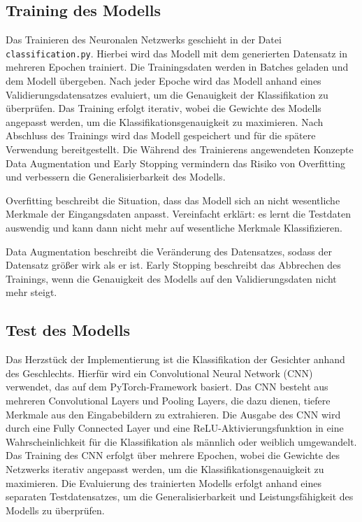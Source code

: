 \documentclass[journal,twoside,web]{ieeecolor}
\begin{document}
\subsection{Training des Modells}
\label{sec:training}
Das Trainieren des Neuronalen Netzwerks geschieht in der Datei \texttt{classification.py}. Hierbei wird das Modell mit dem generierten Datensatz in mehreren Epochen trainiert. Die Trainingsdaten werden in Batches geladen und dem Modell übergeben. Nach jeder Epoche wird das Modell anhand eines Validierungsdatensatzes evaluiert, um die Genauigkeit der Klassifikation zu überprüfen. Das Training erfolgt iterativ, wobei die Gewichte des Modells angepasst werden, um die Klassifikationsgenauigkeit zu maximieren. Nach Abschluss des Trainings wird das Modell gespeichert und für die spätere Verwendung bereitgestellt. Die Während des Trainierens angewendeten Konzepte Data Augmentation und Early Stopping vermindern das Risiko von Overfitting und verbessern die Generalisierbarkeit des Modells.

Overfitting beschreibt die Situation, dass das Modell sich an nicht wesentliche Merkmale der Eingangsdaten anpasst. Vereinfacht erklärt: es lernt die Testdaten auswendig und kann dann nicht mehr auf wesentliche Merkmale Klassifizieren.

Data Augmentation beschreibt die Veränderung des Datensatzes, sodass der Datensatz größer wirk als er ist. 
Early Stopping beschreibt das Abbrechen des Trainings, wenn die Genauigkeit des Modells auf den Validierungsdaten nicht mehr steigt.


\subsection{Test des Modells}
Das Herzstück der Implementierung ist die Klassifikation der Gesichter anhand des Geschlechts. Hierfür wird ein Convolutional Neural Network (CNN) verwendet, das auf dem PyTorch-Framework basiert. Das CNN besteht aus mehreren Convolutional Layers und Pooling Layers, die dazu dienen, tiefere Merkmale aus den Eingabebildern zu extrahieren. Die Ausgabe des CNN wird durch eine Fully Connected Layer und eine ReLU-Aktivierungsfunktion in eine Wahrscheinlichkeit für die Klassifikation als männlich oder weiblich umgewandelt. Das Training des CNN erfolgt über mehrere Epochen, wobei die Gewichte des Netzwerks iterativ angepasst werden, um die Klassifikationsgenauigkeit zu maximieren. Die Evaluierung des trainierten Modells erfolgt anhand eines separaten Testdatensatzes, um die Generalisierbarkeit und Leistungsfähigkeit des Modells zu überprüfen.
\end{document}
